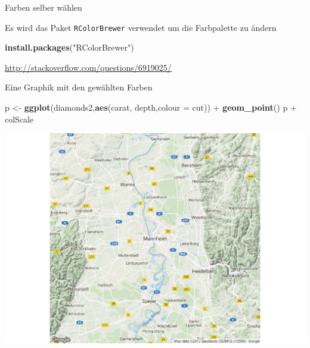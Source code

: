 \documentclass[ignorenonframetext,]{beamer}
\newenvironment{Shaded}{}{}
\newcommand{\KeywordTok}[1]{\textcolor[rgb]{0.00,0.44,0.13}{\textbf{{#1}}}}
\newcommand{\DataTypeTok}[1]{\textcolor[rgb]{0.56,0.13,0.00}{{#1}}}
\newcommand{\DecValTok}[1]{\textcolor[rgb]{0.25,0.63,0.44}{{#1}}}
\newcommand{\StringTok}[1]{\textcolor[rgb]{0.25,0.44,0.63}{{#1}}}
\newcommand{\NormalTok}[1]{{#1}}
\begin{document}
\begin{frame}[fragile]{Farben selber wählen}

Es wird das Paket \texttt{RColorBrewer} verwendet um die Farbpalette zu
ändern

\begin{Shaded}
\begin{Highlighting}[]
\KeywordTok{install.packages}\NormalTok{(}\StringTok{"RColorBrewer"}\NormalTok{)}
\end{Highlighting}
\end{Shaded}

\begin{Shaded}
\end{Shaded}

\url{http://stackoverflow.com/questions/6919025/}

\end{frame}

\begin{frame}[fragile]{Eine Graphik mit den gewählten Farben}

\begin{Shaded}
\begin{Highlighting}[]
\NormalTok{p <-}\StringTok{ }\KeywordTok{ggplot}\NormalTok{(diamonds2,}\KeywordTok{aes}\NormalTok{(carat, depth,}\DataTypeTok{colour =} \NormalTok{cut)) +}\StringTok{ }
\StringTok{  }\KeywordTok{geom_point}\NormalTok{()}
\NormalTok{p +}\StringTok{ }\NormalTok{colScale}
\end{Highlighting}
\end{Shaded}

\includegraphics{R_intern_files/figure-beamer/unnamed-chunk-253-1.pdf}

\end{frame}
\end{document}
